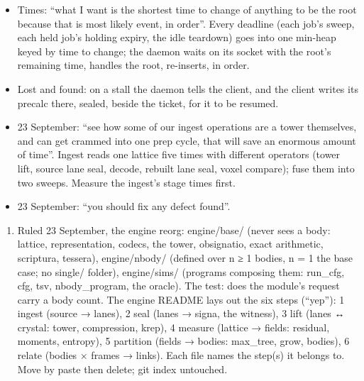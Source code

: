 \begin{itemize}
\item Times: “what I want is the shortest time to change of anything to be the root because that is most likely event, in order”. Every deadline (each job's sweep, each held job's holding expiry, the idle teardown) goes into one min-heap keyed by time to change; the daemon waits on its socket with the root's remaining time, handles the root, re-inserts, in order.
\item Lost and found: on a stall the daemon tells the client, and the client writes its precalc there, sealed, beside the ticket, for it to be resumed.
\item 23 September: “see how some of our ingest operations are a tower themselves, and can get crammed into one prep cycle, that will save an enormous amount of time”. Ingest reads one lattice five times with different operators (tower lift, source lane seal, decode, rebuilt lane seal, voxel compare); fuse them into two sweeps. Measure the ingest's stage times first.
\item 23 September: “you should fix any defect found”.
\end{itemize}

\begin{enumerate}
\item Ruled 23 September, the engine reorg: engine/base/ (never sees a body: lattice, representation, codecs, the tower, obsignatio, exact arithmetic, scriptura, tessera), engine/nbody/ (defined over n ≥ 1 bodies, n = 1 the base case; no single/ folder), engine/sims/ (programs composing them: run\_\allowbreak{}cfg, cfg, tsv, nbody\_\allowbreak{}program, the oracle). The test: does the module's request carry a body count. The engine README lays out the six steps (“yep”): 1 ingest (source → lanes), 2 seal (lanes → signa, the witness), 3 lift (lanes ↔ crystal: tower, compression, krep), 4 measure (lattice → fields: residual, moments, entropy), 5 partition (fields → bodies: max\_\allowbreak{}tree, grow, bodies), 6 relate (bodies × frames → links). Each file names the step(s) it belongs to. Move by paste then delete; git index untouched.
\end{enumerate}

